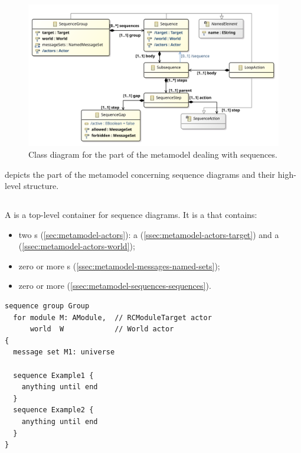 \begin{figure}
	\centering
	\includegraphics[width=\textwidth]{diagrams/Sequences}
	\caption{Class diagram for the part of the \langname{} metamodel dealing with sequences.}
	\label{fig:metamodel-sequences}
\end{figure}

 depicts the part of the metamodel concerning
sequence diagrams and their high-level structure.

\subsection{\msequencegroup}

A \msequencegroup{} is a top-level container for sequence diagrams.
It is a \mnamedelement{} that contains:

\begin{itemize}
\item
  two \mactor s (\cref{sec:metamodel-actors}):
  a \mtarget{} (\cref{ssec:metamodel-actors-target})
  and a \mworld{} (\cref{ssec:metamodel-actors-world});
\item
  zero or more \mnamedmessageset{}s (\cref{ssec:metamodel-messages-named-sets});
\item
  zero or more \msequence{} (\cref{ssec:metamodel-sequences-sequences}).
\end{itemize}

\begin{lstlisting}[style=Example]
sequence group Group
  for module M: AModule,  // RCModuleTarget actor
      world  W            // World actor
{
  message set M1: universe
  
  sequence Example1 {
    anything until end
  }
  sequence Example2 {
    anything until end
  }
}
\end{lstlisting}

